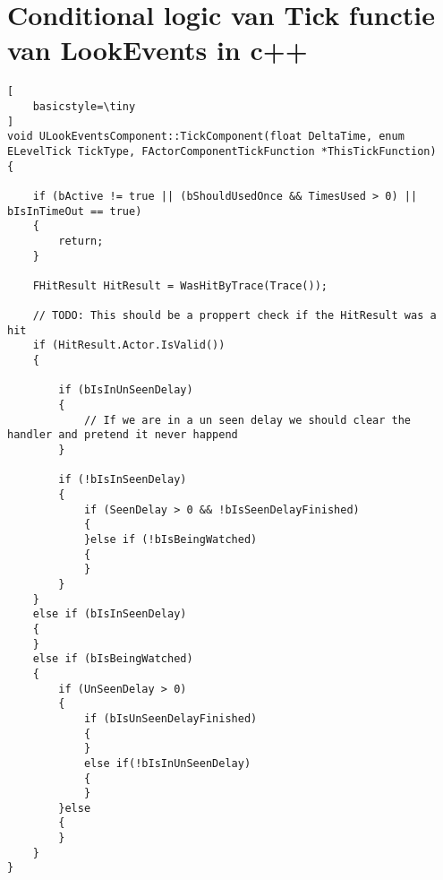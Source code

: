 \chapter{Conditional logic van Tick functie van LookEvents in c++}
\label{appendix:LookEventsLogicC}

\begin{lstlisting}[
	basicstyle=\tiny
]
void ULookEventsComponent::TickComponent(float DeltaTime, enum ELevelTick TickType, FActorComponentTickFunction *ThisTickFunction) 
{

	if (bActive != true || (bShouldUsedOnce && TimesUsed > 0) || bIsInTimeOut == true) 
	{
		return;
	}

	FHitResult HitResult = WasHitByTrace(Trace());

	// TODO: This should be a proppert check if the HitResult was a hit 
	if (HitResult.Actor.IsValid())
	{

		if (bIsInUnSeenDelay) 
		{
			// If we are in a un seen delay we should clear the handler and pretend it never happend
		}

		if (!bIsInSeenDelay) 
		{
			if (SeenDelay > 0 && !bIsSeenDelayFinished) 
			{
			}else if (!bIsBeingWatched) 
			{		
			}
		}
	}
	else if (bIsInSeenDelay)
	{
	}
	else if (bIsBeingWatched) 
	{
		if (UnSeenDelay > 0) 
		{
			if (bIsUnSeenDelayFinished) 
			{				
			}
			else if(!bIsInUnSeenDelay)
			{					
			}
		}else
		{
		}
	}
}
\end{lstlisting}